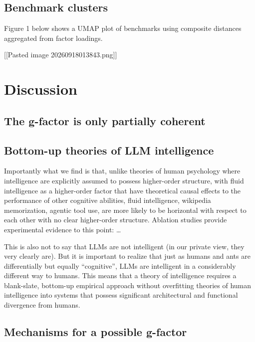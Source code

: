 \documentclass{article} %
\begin{document}
\hypertarget{benchmark-clusters}{%
\subsection{Benchmark clusters}\label{benchmark-clusters}}

Figure 1 below shows a UMAP plot of benchmarks using composite distances aggregated from factor loadings.

{[}{[}Pasted image 20260918013843.png{]}{]}

\hypertarget{discussion}{%
\section{Discussion}\label{discussion}}

\hypertarget{the-g-factor-is-only-partially-coherent}{%
\subsection{The g-factor is only partially coherent}\label{the-g-factor-is-only-partially-coherent}}

\hypertarget{bottom-up-theories-of-llm-intelligence}{%
\subsection{Bottom-up theories of LLM intelligence}\label{bottom-up-theories-of-llm-intelligence}}

Importantly what we find is that, unlike theories of human psychology \citep{schneider2018} where intelligence are explicitly assumed to possess higher-order structure, with fluid intelligence as a
higher-order factor that have theoretical causal effects \citep{vandermaas2014} to the performance of other cognitive abilities, fluid intelligence, wikipedia memorization, agentic tool use, are more
likely to be horizontal with respect to each other with no clear higher-order structure. Ablation studies provide experimental evidence to this point: \ldots{}

This is also not to say that LLMs are not intelligent (in our private view, they very clearly are). But it is important to realize that just as humans and ants are differentially but equally
``cognitive'', LLMs are intelligent in a considerably different way to humans. This means that a theory of intelligence requires a blank-slate, bottom-up empirical approach without overfitting
theories of human intelligence into systems that possess significant architectural and functional divergence from humans.

\hypertarget{mechanisms-for-a-possible-g-factor}{%
\subsection{Mechanisms for a possible g-factor}\label{mechanisms-for-a-possible-g-factor}}




\end{document}
